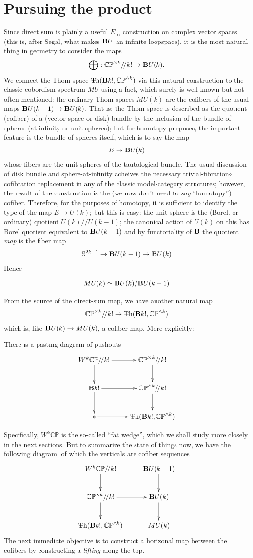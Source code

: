 \documentclass{article}
\newcommand{\CP}{\mathbb{CP}}
\newcommand{\sph}{\mathbb{S}}
\newcommand{\6}{\partial}
\newcommand{\8}{\infty}
\newcommand{\bq}{/\!/}
\newcommand{\smsh}{\wedge}
\begin{document}
\section{Pursuing the product}
Since direct sum is plainly a useful $E_\infty$ construction on complex vector spaces (this is, after Segal, what makes $\mathbf{B} U$ an infinite loopspace), it is the most natural thing in geometry to consider the maps
$$ \bigoplus : \CP^{\times k} \bq  k! \to \deloop U(k).$$
We connect the Thom space $\Th(\deloop k!,\CP^{\smsh k})$ via this natural construction to the classic cobordism spectrum $MU$ using a fact, which surely is well-known but not often mentioned: the ordinary Thom spaces $MU(k)$ are the cofibers of the usual maps $\mathbf{B} U(k-1)\to \mathbf{B} U(k)$.  That is: the Thom space is described as the quotient (cofiber) of a (vector space or disk) bundle by the inclusion of the bundle of spheres (at-infinity or unit spheres); but for homotopy purposes, the important feature is the bundle of spheres itself, which is to say the map
$$ E \to \mathbf{B} U(k) $$ whose fibers are the unit spheres of the tautological bundle.  
The usual discussion of disk bundle and sphere-at-infinity acheives the necessary trivial-fibration$\circ$cofibration replacement in any of the classic model-category structures; however, the result of the construction is the (we now don't need to {\em say} ``homotopy'') cofiber.  Therefore, for the purposes of homotopy, it is sufficient to identify the type of the map $E\to U(k)$; but this is easy: the unit sphere is the (Borel, or ordinary) quotient $U(k)\bq U(k-1)$; the canonical action of $U(k)$ on this has Borel quotient equivalent to $\mathbf{B} U(k-1)$ and by functoriality of $\mathbf{B}$ the quotient {\em map} is the fiber map
$$ \sph^{2k-1} \to \deloop U(k-1) \to \deloop U(k) $$
Hence
\begin{lemma} $$ MU(k) \simeq \mathbf{B} U(k) / \mathbf{B} U(k-1) $$ \end{lemma}
From the source of the direct-sum map, we have another natural map
$$ \CP^{\times k}\bq k! \to \Th(\deloop k!,\CP^{\smsh k}) $$
which is, like $\mathbf{B} U(k)\to MU(k)$, a cofiber map.
More explicitly:
\begin{lemma} There is a pasting diagram of pushouts
$$\begin{xy}\xymatrix{ W^k \CP \bq k! \ar[r] \ar[d] & \CP^{\times k}\bq k! \ar[d] \\
\deloop k! \ar[r] \ar[d] & \CP^{\smsh k}\bq k! \ar[d] \\
{*} \ar[r] & \Th(\deloop k!, \CP^{\smsh k}) }
\end{xy} $$
\end{lemma} Specifically, $W^k \CP$ is the so-called ``fat wedge'', which we shall study more closely in the next sections.  But to summarize the state of things now, we have the following diagram, of which the verticals are cofiber sequences
$$\begin{xy}\xymatrix{
W^k \CP\bq k! \ar[d] & \deloop U(k-1) \ar[d] \\
\CP^{\times k} \bq k! \ar[r] \ar[d] & \deloop U(k) \ar[d] \\
\Th(\deloop k!,\CP^{\smsh k}) & MU(k) 
}\end{xy}$$
The next immediate objective is to construct a horizonal map between the cofibers by constructing a {\em lifting} along the top.
\end{document}
